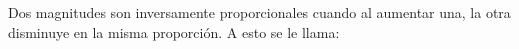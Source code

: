 
\question Dos magnitudes son inversamente proporcionales cuando al aumentar
          una, la otra disminuye en la misma proporción. A esto se le llama:
